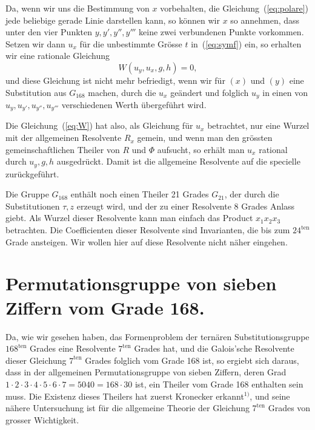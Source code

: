 \documentclass[12pt,a4paper]{article}
\begin{document}

Da, wenn wir uns die Bestimmung von $x$ vorbehalten, die Gleichung~(\ref{eq:polare}) jede beliebige gerade Linie darstellen kann, so k\"onnen wir $x$ so annehmen, dass unter den vier Punkten $y, y', y'', y'''$ keine zwei verbundenen Punkte vorkommen. Setzen wir dann $u_x$ f\"ur die unbestimmte Gr\"osse $t$ in~(\ref{eq:symf}) ein, so erhalten wir eine rationale Gleichung
\begin{equation}
\label{eq:W} W(u_y, u_x, g, h) = 0,
\end{equation}
und diese Gleichung ist nicht mehr befriedigt, wenn wir f\"ur $(x)$ und $(y)$ eine Substitution aus $G_{168}$ machen, durch die $u_x$ ge\"andert und folglich $u_y$ in einen von $u_y, u_{y'}, u_{y''}, u_{y'''}$ verschiedenen Werth \"ubergef\"uhrt wird.

Die Gleichung~(\ref{eq:W}) hat also, als Gleichung f\"ur $u_x$ betrachtet, nur eine Wurzel mit der allgemeinen Resolvente $R_x$ gemein, und wenn man den gr\"ossten gemeinschaftlichen Theiler von $R$ und $\Phi$ aufsucht, so erh\"alt man $u_x$ rational durch $u_y, g, h$ ausgedr\"uckt. Damit ist die allgemeine Resolvente auf die specielle zur\"uckgef\"uhrt.

Die Gruppe $G_{168}$ enth\"alt noch einen Theiler 21 Grades $G_{21}$, der durch die Substitutionen $\tau, z$ erzeugt wird, und der zu einer Resolvente 8 Grades Anlass giebt. Als Wurzel dieser Resolvente kann man einfach das Product $x_1 x_2 x_3$ betrachten. Die Coefficienten dieser Resolvente sind Invarianten, die bis zum $24^{\text{ten}}$ Grade ansteigen. Wir wollen hier auf diese Resolvente nicht n\"aher eingehen.

\newpage
\section{Permutationsgruppe von sieben Ziffern vom Grade 168.}
\label{sec:127}

Da, wie wir gesehen haben, das Formenproblem der tern\"aren Substitutionsgruppe $168^{\text{ten}}$ Grades eine Resolvente $7^{\text{ten}}$ Grades hat, und die Galois'sche Resolvente dieser Gleichung $7^{\text{ten}}$ Grades folglich vom Grade 168 ist, so ergiebt sich daraus, dass in der allgemeinen Permutationsgruppe von sieben Ziffern, deren Grad $1 \cdot 2 \cdot 3 \cdot 4 \cdot 5 \cdot 6 \cdot 7 = 5040 = 168 \cdot 30$ ist, ein Theiler vom Grade 168 enthalten sein muss. Die Existenz dieses Theilers hat zuerst Kronecker erkannt$^{1)}$, und seine n\"ahere Untersuchung ist f\"ur die allgemeine Theorie der Gleichung $7^{\text{ten}}$ Grades von grosser Wichtigkeit.
\end{document}
